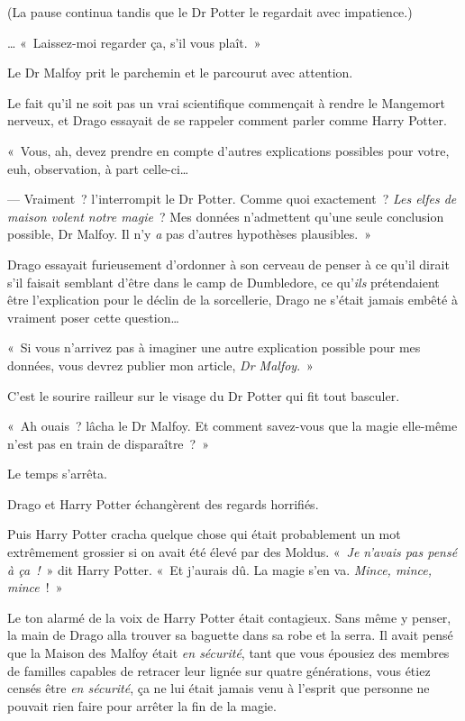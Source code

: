 (La pause continua tandis que le Dr Potter le regardait avec impatience.)

… «~Laissez-moi regarder ça, s'il vous plaît.~»

Le Dr Malfoy prit le parchemin et le parcourut avec attention.

Le fait qu'il ne soit pas un vrai scientifique commençait à rendre le Mangemort nerveux, et Drago essayait de se rappeler comment parler comme Harry Potter.

«~Vous, ah, devez prendre en compte d'autres explications possibles pour votre, euh, observation, à part celle-ci…

--- Vraiment~? l'interrompit le Dr Potter. Comme quoi exactement~? \emph{Les elfes de maison volent notre magie}~? Mes données n'admettent qu'une seule conclusion possible, Dr Malfoy. Il n'y \emph{a} pas d'autres hypothèses plausibles.~»

Drago essayait furieusement d'ordonner à son cerveau de penser à ce qu'il dirait s'il faisait semblant d'être dans le camp de Dumbledore, ce qu'\emph{ils} prétendaient être l'explication pour le déclin de la sorcellerie, Drago ne s'était jamais embêté à vraiment poser cette question…

«~Si vous n'arrivez pas à imaginer une autre explication possible pour mes données, vous devrez publier mon article, \emph{Dr Malfoy}.~»

C'est le sourire railleur sur le visage du Dr Potter qui fit tout basculer.

«~Ah ouais~? lâcha le Dr Malfoy. Et comment savez-vous que la magie elle-même n'est pas en train de disparaître~?~»

Le temps s'arrêta.

Drago et Harry Potter échangèrent des regards horrifiés.

Puis Harry Potter cracha quelque chose qui était probablement un mot extrêmement grossier si on avait été élevé par des Moldus. «~\emph{Je n'avais pas pensé à ça~!}~» dit Harry Potter. «~Et j'aurais dû. La magie s'en va. \emph{Mince, mince, mince}~!~»

Le ton alarmé de la voix de Harry Potter était contagieux. Sans même y penser, la main de Drago alla trouver sa baguette dans sa robe et la serra. Il avait pensé que la Maison des Malfoy était \emph{en sécurité}, tant que vous épousiez des membres de familles capables de retracer leur lignée sur quatre générations, vous étiez censés être \emph{en sécurité}, ça ne lui était jamais venu à l'esprit que personne ne pouvait rien faire pour arrêter la fin de la magie.

